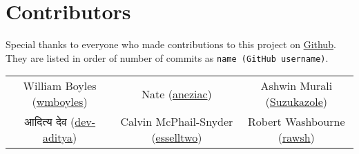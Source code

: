 \section{Contributors}
Special thanks to everyone who made contributions to this project on \href{https://github.com/wmboyles/Math-Summaries}{Github}.
They are listed in order of number of commits as \texttt{name (GitHub username)}.

\begin{center}
    \begin{tabular}{ c c c }
    	William Boyles (\href{https://github.com/wmboyles}{wmboyles}) & Nate (\href{https://github.com/aneziac}{aneziac}) & Ashwin Murali (\href{https://github.com/Suzukazole}{Suzukazole}) \\
		आदित्य देव (\href{https://github.com/dev-aditya}{dev-aditya}) & Calvin McPhail-Snyder (\href{https://github.com/esselltwo}{esselltwo}) & Robert Washbourne (\href{https://github.com/rawsh}{rawsh}) \\
	\end{tabular}
\end{center}
